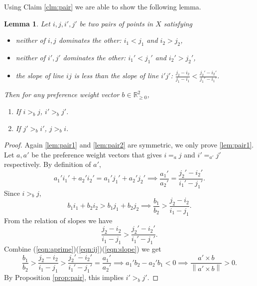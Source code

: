 \documentclass[12pt]{article}
\newtheorem{lemma}[theorem]{Lemma}
\newcommand{\norm}[1]{\left\lVert{#1}\right\rVert}
\newcommand{\1}[1]{\mathds{1}[{#1}]}
\begin{document}
Using Claim \ref{clm:pair} we are able to show the following lemma.

\begin{lemma} \label{lem:pair}
Let $i, j, i', j'$ be two pairs of points in $X$ satisfying
\begin{itemize}
	\item neither of $i, j$ dominates the other: $i_1 < j_1$ and $i_2 > j_2$,
	
	\item neither of $i', j'$ dominates the other: $i_1' < j_1'$ and $i_2' > j_2'$,
	
	\item the slope of line $ij$ is less than the slope of line $i'j'$: $\frac{j_2 - i_2}{j_1 - i_1} < \frac{j_2' - i_2'}{j_1' - i_1'}$.
\end{itemize}
Then for any preference weight vector $b \in \mathbb{R}_{\geq 0}^2$,
\begin{enumerate}
	\item \label{lem:pair1}
	If $i >_b j$, $i' >_b j'$.
	
	\item \label{lem:pair2}
	If $j' >_b i'$, $j >_b i$.
\end{enumerate}
\end{lemma}

\begin{proof}
Again \ref{lem:pair1} and \ref{lem:pair2} are symmetric, we only prove \ref{lem:pair1}.
Let $a, a'$ be the preference weight vectors that gives $i =_a j$ and $i' =_{a'} j'$ respectively.
By definition of $a'$,
\begin{equation} \label{eqn:aprime}
	a_1' i_1' + a_2' i_2' = a_1' j_1' + a_2' j_2'
	\implies \frac{a_1'}{a_2'} = \frac{j_2' - i_2'}{i_1' - j_1'}.
\end{equation}
Since $i >_b j$,
\begin{equation} \label{eqn:ij}
	b_1 i_1 + b_2 i_2 > b_1 j_1 + b_2 j_2
	\implies \frac{b_1}{b_2} > \frac{j_2 - i_2}{i_1 - j_1}.
\end{equation}
From the relation of slopes we have
\begin{equation} \label{eqn:slope}
	\frac{j_2 - i_2}{i_1 - j_1} > \frac{j_2' - i_2'}{i_1' - j_1'}.
\end{equation}
Combine (\ref{eqn:aprime})(\ref{eqn:ij})(\ref{eqn:slope}) we get
\[
	 \frac{b_1}{b_2} > \frac{j_2 - i_2}{i_1 - j_1} > \frac{j_2' - i_2'}{i_1' - j_1'} = \frac{a_1'}{a_2'}
	 \implies a_1' b_2 - a_2' b_1 < 0 
	 \implies \frac{a' \times b}{\norm{a' \times b}} > 0.
\]
By Proposition \ref{prop:pair}, this implies $i' >_b j'$.
\end{proof}
\end{document}
